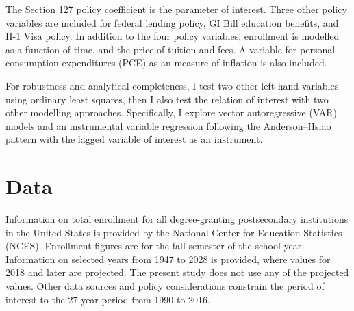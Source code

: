 \documentclass[review]{elsarticle}
\begin{document}
    The Section 127 policy coefficient is the parameter of interest.
    Three other policy variables are included for federal lending policy, GI Bill education benefits, and H-1 Visa policy.
    In addition to the four policy variables, 
    enrollment is modelled as a function of time,
    and the price of tuition and fees.
    A variable for personal consumption expenditures (PCE) as an measure of inflation is also included.

    For robustness and analytical completeness, I test two other left hand variables using ordinary least squares,
    then I also test the relation of interest with two other modelling approaches.
    Specifically, I explore vector autoregressive (VAR) models
    and an instrumental variable regression following the Anderson–Hsiao pattern\cite{anderson1981estimation} with the lagged variable of interest as an instrument.

    \section{Data}

    Information on total enrollment for all degree-granting postsecondary institutions in the United States
    is provided by the National Center for Education Statistics (NCES)\cite{nces_2019}.
    Enrollment figures are for the fall semester of the school year.
    Information on selected years from 1947 to 2028 is provided, where values for 2018 and later are projected.
    The present study does not use any of the projected values.
    Other data sources and policy considerations constrain the period of interest to the 27-year period from 1990 to 2016.    


\end{document}
